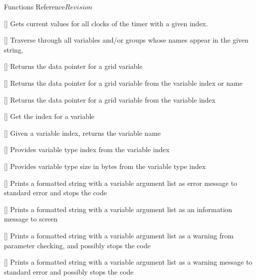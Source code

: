 \begin{cactuspart}{ Functions Reference}{}{$Revision$}
\begin{Lentry}
\item[\code{CCTK\_TimerStopI}] [\pageref{CCTK-TimerStopI}]
  Gets current values for all clocks of the timer with a given index.

\item[\code{CCTK\_TraverseString}] [\pageref{CCTK-TraverseString}]
  Traverse through all variables and/or groups whose names appear in the given string.

\item[\code{CCTK\_VarDataPtr}] [\pageref{CCTK-VarDataPtr}]
  Returns the data pointer for a grid variable

\item[\code{CCTK\_VarDataPtrB}] [\pageref{CCTK-VarDataPtrB}]
  Returns the data pointer for a grid variable from the variable index or name

\item[\code{CCTK\_VarDataPtrI}] [\pageref{CCTK-VarDataPtrI}]
  Returns the data pointer for a grid variable from the variable index

\item[\code{CCTK\_VarIndex}]
   [\pageref{CCTK-VarIndex}]
  Get the index for a variable

\item[\code{CCTK\_VarName}] [\pageref{CCTK-VarName}]
  Given a variable index, returns the variable name

\item[\code{CCTK\_VarTypeI}] [\pageref{CCTK-VarTypeI}]
  Provides variable type index from the variable index

\item[\code{CCTK\_VarTypeSize}] [\pageref{CCTK-VarTypeSize}]
  Provides variable type size in bytes from the variable type index

\item[\code{CCTK\_VError}] [\pageref{CCTK-VError}]
  Prints a formatted string with a variable argument list as error
  message to standard error and stops the code

\item[\code{CCTK\_VInfo}] [\pageref{CCTK-VInfo}]
  Prints a formatted string with a variable argument list as an information
  message to screen

\item[\code{CCTK\_VParamWarn}] [\pageref{CCTK-VParamWarn}]
  Prints a formatted string with a variable argument list as a warning from
  parameter checking, and possibly stops the code

\item[\code{CCTK\_VWarn}] [\pageref{CCTK-VWarn}]
  Prints a formatted string with a variable argument list as a warning message
  to standard error and possibly stops the code


\end{Lentry}
\end{cactuspart}
